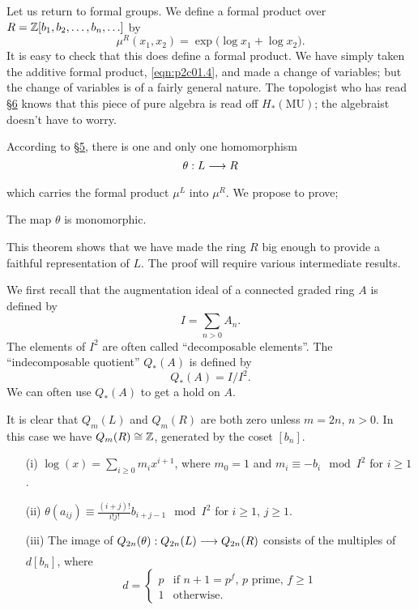 \documentclass[../main]{subfiles}
\begin{document}
Let us return to formal groups. We define a formal product over $R = \mathbb{Z}[b_1, b_2, \ldots, b_n, \ldots]$ by 
\begin{equation}
\tag{7.7}
\label{eqn:p2c07.7}
\mu^R(x_1, x_2) = \exp \big(\log x_1 + \log x_2\big).
\end{equation}
It is easy to check that this does define a formal product. We have simply taken the additive formal product, \eqref{eqn:p2c01.4}, and made a change of variables; but the change of variables is of a fairly general nature. The topologist who has read \hyperref[sec:p2c6]{\S 6} knows that this piece of pure algebra is read off $H_\ast(\mathrm{MU})$; the algebraist doesn't have to worry.

According to \hyperref[sec:p2c5]{\S 5}, there is one and only one homomorphism \[\theta : L \lar{} R\] which carries the formal product $\mu^L$ into $\mu^R$. We propose to prove; 

\begin{customthm}{7.8}
\label{thm:p2c07.8}
The map $\theta$ is monomorphic.
\end{customthm}

This theorem shows that we have made the ring $R$ big enough to provide a faithful representation of $L$. The proof will require various intermediate results. 

We first recall that the augmentation ideal of a connected graded ring $A$ is defined by \[I = \sum_{n > 0} A_n.\] The elements of $I^2$ are often called ``decomposable elements''. The ``indecomposable quotient'' $Q_\ast(A)$ is defined by \[Q_\ast(A) = I/I^2.\] We can often use $Q_\ast(A)$ to get a hold on $A$.

It is clear that $Q_m(L)$ and $Q_m(R)$ are both zero unless $m = 2n$, $n > 0$. In this case we have $Q_m(R) \cong \mathbb{Z}$, generated by the coset $[b_n]$. 

\begin{customlemma}{7.9}
\label{lem:p2c07.9}
\begin{enumerate}
    \item[(i)] $\displaystyle \log(x) = \sum_{i \ge 0} m_i x^{i + 1}$, where $m_0 = 1$ and $m_i \equiv -b_i \mod I^2$ for $i \ge 1$. 
    \item[(ii)] $\theta(a_{ij}) \equiv \tfrac {(i + j)!} {i! j!} b_{i + j - 1} \mod I^2$ for $i \ge 1$, $j \ge 1$.
    \item[(iii)] The image of $Q_{2n}(\theta) : Q_{2n}(L) \lar{} Q_{2n}(R)$ consists of the multiples of $d[b_n]$, where \[d = \begin{cases}p & \text {if } n + 1 = p^f, \, p \text { prime}, \, f \ge 1 \\ 1 & \text{otherwise.}\end{cases}\]
\end{enumerate}
\end{customlemma}
\end{document}
